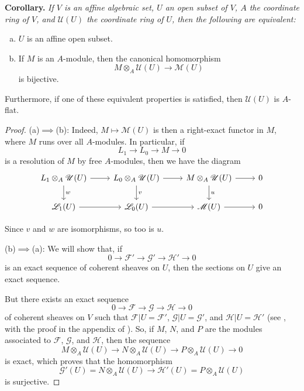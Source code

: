 \documentclass{article}
\newenvironment{itenv}[1]
  {\par\medskip\noindent\textbf{#1.}\itshape}
  {\medskip}
\newcommand{\scr}[1]{{\mathscr{#1}}}
\newcommand{\oldpage}[1]{\marginpar{\footnotesize$\Big\vert$ \textit{p.~#1}}}
\begin{document}
\begin{itenv}{Corollary}
  If $V$ is an affine algebraic set, $U$ an open subset of $V$, $A$ the coordinate ring of $V$, and $\scr{U}(U)$ the coordinate ring of $U$, then the following are equivalent:
  \begin{enumerate}[(a)]
    \item $U$ is an affine open subset.
    \item If $M$ is an $A$-module, then the canonical homomorphism
      \[
        M\otimes_A\scr{U}(U) \to \scr{M}(U)
      \]
      is bijective.
  \end{enumerate}

\oldpage{2-08}
  Furthermore, if one of these equivalent properties is satisfied, then $\scr{U}(U)$ is $A$-flat.
\end{itenv}

\begin{proof}
  (a)$\implies$(b):
  Indeed, $M\mapsto\scr{M}(U)$ is then a right-exact functor in $M$, where $M$ runs over all $A$-modules.
  In particular, if
  \[
    L_1 \to L_0 \to M \to 0
  \]
  is a resolution of $M$ by free $A$-modules, then we have the diagram
  \[
    \begin{tikzcd}
      L_1\otimes_A\scr{U}(U) \rar \dar["w"]
      & L_0\otimes_A\scr{U}(U) \rar \dar["v"]
      & M\otimes_A\scr{U}(U) \rar \dar["u"]
      & 0
    \\\scr{L}_1(U) \rar
      & \scr{L}_0(U) \rar
      & \scr{M}(U) \rar
      & 0
    \end{tikzcd}
  \]

  Since $v$ and $w$ are isomorphisms, so too is $u$.

  \bigskip
  (b)$\implies$(a):
  We will show that, if
  \[
    0 \to \scr{F}' \to\scr{G}' \to \scr{H}' \to 0
  \]
  is an exact sequence of coherent sheaves on $U$, then the sections on $U$ give an exact sequence.

  But there exists an exact sequence
  \[
    0 \to \scr{F} \to \scr{G} \to \scr{H} \to 0
  \]
  of coherent sheaves on $V$ such that $\scr{F}|U=\scr{F}'$, $\scr{G}|U=\scr{G}'$, and $\scr{H}|U=\scr{H}'$ (see \cite{1}, with the proof in the appendix of \cite{2}).
  So, if $M$, $N$, and $P$ are the modules associated to $\scr{F}$, $\scr{G}$, and $\scr{H}$, then the sequence
  \[
    M\otimes_A\scr{U}(U) \to N\otimes_A\scr{U}(U) \to P\otimes_A\scr{U}(U) \to 0
  \]
  is exact, which proves that the homomorphism
  \[
    \scr{G}'(U) = N\otimes_A\scr{U}(U) \to \scr{H}'(U) = P\otimes_A\scr{U}(U)
  \]
  is surjective.
\end{proof}
\end{document}
